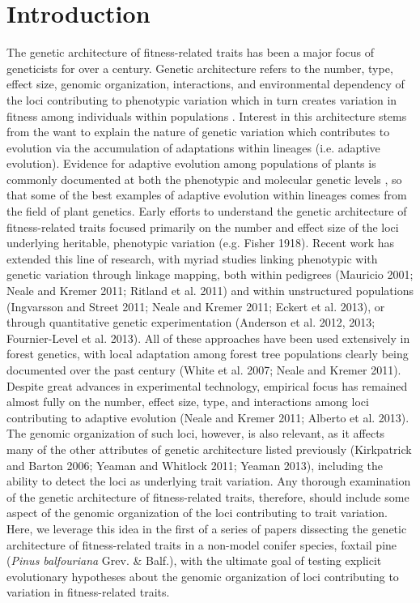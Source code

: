 \documentclass[11pt]{article}
\begin{document}
\section{Introduction}
The genetic architecture of fitness-related traits has been a major focus of geneticists for 
over a century. Genetic architecture refers to the number, type, effect size, genomic organization, 
interactions, and environmental dependency of the loci contributing to phenotypic variation 
which in turn creates variation in fitness among individuals within populations \citep{Eckert:2012a}. 
Interest in this architecture stems from the want to explain the nature of genetic variation which 
contributes to evolution via the accumulation of adaptations within lineages (i.e. adaptive evolution).
Evidence for adaptive evolution among populations of plants is commonly documented at both the phenotypic 
and molecular genetic levels \citep{Kawecki:2004, Pannell:2013}, so that some of the best
examples of adaptive evolution within lineages comes from the field of plant genetics.
Early efforts to understand the genetic architecture of fitness-related traits
focused primarily on the number and effect size of the loci underlying heritable, phenotypic variation (e.g. Fisher 1918). 
Recent work has extended this line of research, with myriad studies linking phenotypic with genetic variation 
through linkage mapping, both within pedigrees (Mauricio 2001; Neale and Kremer 2011; Ritland et al. 2011) and within 
unstructured populations (Ingvarsson and Street 2011; Neale and Kremer 2011; Eckert et al. 2013), 
or through quantitative genetic experimentation (Anderson et al. 2012, 2013; Fournier-Level et al. 2013). All of these approaches 
have been used extensively in forest genetics, with local adaptation among forest tree populations clearly
being documented over the past century (White et al. 2007; Neale and Kremer 2011). Despite great advances in experimental technology, empirical 
focus has remained almost fully on the number, effect size, type, and interactions among loci contributing 
to adaptive evolution (Neale and Kremer 2011; Alberto et al. 2013). The genomic organization of such loci, however, 
is also relevant, as it affects many of the other attributes of genetic architecture listed previously 
(Kirkpatrick and Barton 2006; Yeaman and Whitlock 2011; Yeaman 2013), including the ability to detect the loci as underlying trait variation. 
Any thorough examination of the genetic architecture of fitness-related traits, therefore, should include 
some aspect of the genomic organization of the loci contributing to trait variation. Here, we leverage 
this idea in the first of a series of papers dissecting the genetic architecture of fitness-related 
traits in a non-model conifer species, foxtail pine (\textit{Pinus balfouriana} Grev. \& Balf.), with the 
ultimate goal of testing explicit evolutionary hypotheses about the genomic organization of loci 
contributing to variation in fitness-related traits.
\end{document}
